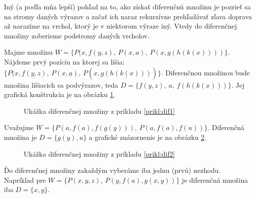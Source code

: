 \begin{poznamka}
    Iný (a podľa mňa lepší) pohľad na to, ako získať diferenčnú množinu je
    pozrieť sa na stromy daných výrazov a začať ich naraz rekurzívne
    prehľadávať zľava doprava až narazíme na vrchol, ktorý je v niektorom
    výraze iný. Vtedy do diferenčnej množiny zoberieme podstromy daných
    vrcholov.
\end{poznamka}

\begin{priklad}
    \label{prikl:dif1}
    Majme množinu $W = \{P(x,f(y,z),\ P(x,a),\ P(x,g(h(k(x))))\}$.
    Nájdeme prvý pozíciu na ktorej sa líšia:
    $\{P(x,\underline{f(y,z)},\ P(x,\underline{a}),\
    P(x,\underline{g(h(k(x)))}) \}$.
    Diferenčnou množinou bude množina líšiacich sa podvýrazov, teda
    $D= \{ f(y,z),\ a,\ f(h(k(x)))\}$. Jej grafická konštrukcia je na
    obrázku \ref{fig:dif1}.
    \begin{figure}[h]

        \caption{Ukážka diferenčnej množiny z príkladu \ref{prikl:dif1}}
        \label{fig:dif1}
    \end{figure}
\end{priklad}

\begin{priklad}
    \label{prikl:dif2}
    Uvažujme $W=\{P(a,f(a),f(g(y))),\ P(a,f(a),f(u))\}$.
    Diferenčná množina je $D=\{g(y),u\}$ a grafické znázornenie je na
    obrázku \ref{fig:dif2}.
    \begin{figure}[h]

        \caption{Ukážka diferenčnej množiny z príkladu \ref{prikl:dif2}}
        \label{fig:dif2}
    \end{figure}
\end{priklad}

\begin{poznamka}
    Ďo diferenčnej množiny zakaždým vyberáme iba jednu (prvú) nezhodu.
    Napríklad pre $W=\{P(x,y,z),\ P(y,f(a),g(x,y))\}$ je diferenčná množina
    iba $D=\{x,y\}$.
\end{poznamka}

